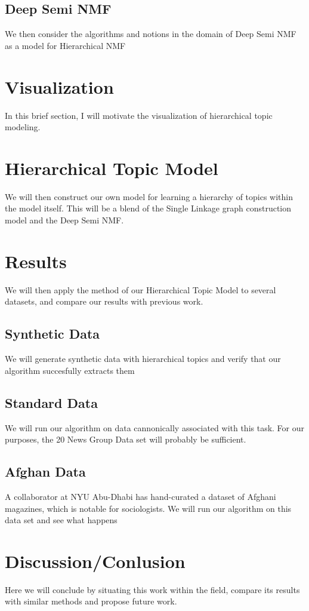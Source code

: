 \documentclass[12pt]{article}
\begin{document}
\subsection{Deep Semi NMF}
We then consider the algorithms and notions in the domain of Deep Semi NMF as a model for Hierarchical NMF \cite{ deepNonNeg, trigeorgis2014deep} 
\section{Visualization}
In this brief section, I will motivate the visualization of hierarchical topic modeling.
\section{Hierarchical Topic Model}
We will then construct our own model for learning a hierarchy of topics within the model itself. This will be a blend of the Single Linkage graph construction model and the Deep Semi NMF.

\section{Results}
We will then apply the method of our Hierarchical Topic Model to several datasets, and compare our results with previous work.
\subsection{Synthetic Data}
We will generate synthetic data with hierarchical topics and verify that our algorithm succesfully extracts them
\subsection{Standard Data}
We will run our algorithm on data cannonically associated with this task. For our purposes, the 20 News Group Data set will probably be sufficient.
\subsection{Afghan Data}
A collaborator at NYU Abu-Dhabi has hand-curated a dataset of Afghani magazines, which is notable for sociologists. We will run our algorithm on this data set and see what happens

\section{Discussion/Conlusion}
Here we will conclude by situating this work within the field, compare its results with similar methods and propose future work.




\end{document}
